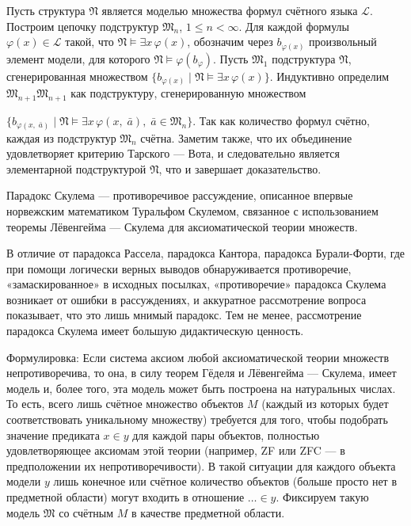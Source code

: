 \documentclass[12pt, specialist, subf, substylefile = spbu.rtx]{disser}
\begin{document}
Пусть структура ${\mathfrak  N}$ является моделью множества формул счётного языка $ {\mathcal  L}$. Построим цепочку подструктур ${\mathfrak  {M}}_{n}$, $1\leqslant n<\infty $. Для каждой формулы $\varphi (x)\in {\mathcal  {L}}$ такой, что ${\mathfrak  {N}}\models \exists x\,\varphi (x)$, обозначим через $b_{{\varphi (x)}}$ произвольный элемент модели, для которого ${\mathfrak  {N}}\models \varphi (b_{\varphi })$. Пусть ${\mathfrak  {M}}_{1}$ подструктура ${\mathfrak  {N}}$, сгенерированная множеством $\{b_{{\varphi (x)}}\mid {\mathfrak  {N}}\models \exists x\,\varphi (x)\}$.
Индуктивно определим ${\displaystyle {\mathfrak {M}}_{n+1}} {\mathfrak  {M}}_{{n+1}}$ как подструктуру, сгенерированную множеством

$\{b_{{\varphi (x,\;{\bar  {a}})}}\mid {\mathfrak  {N}}\models \exists x\,\varphi (x,\;{\bar  {a}}),\;{\bar  {a}}\in {\mathfrak  {M}}_{n}\}$.
Так как количество формул счётно, каждая из подструктур ${\mathfrak  {M}}_{n}$ счётна. Заметим также, что их объединение удовлетворяет критерию Тарского — Вота, и следовательно является элементарной подструктурой ${\mathfrak  {N}}$, что и завершает доказательство.

Парадокс Скулема — противоречивое рассуждение, описанное впервые норвежским математиком Туральфом Скулемом, связанное с использованием теоремы Лёвенгейма — Скулема для аксиоматической теории множеств.

В отличие от парадокса Рассела, парадокса Кантора, парадокса Бурали-Форти, где при помощи логически верных выводов обнаруживается противоречие, «замаскированное» в исходных посылках, «противоречие» парадокса Скулема возникает от ошибки в рассуждениях, и аккуратное рассмотрение вопроса показывает, что это лишь мнимый парадокс. Тем не менее, рассмотрение парадокса Скулема имеет большую дидактическую ценность.

Формулировка: Если система аксиом любой аксиоматической теории множеств непротиворечива, то она, в силу теорем Гёделя и Лёвенгейма — Скулема, имеет модель и, более того, эта модель может быть построена на натуральных числах. То есть, всего лишь счётное множество объектов $M$ (каждый из которых будет соответствовать уникальному множеству) требуется для того, чтобы подобрать значение предиката $x\in y$ для каждой пары объектов, полностью удовлетворяющее аксиомам этой теории (например, ZF или ZFC — в предположении их непротиворечивости). В такой ситуации для каждого объекта модели $y$ лишь конечное или счётное количество объектов (больше просто нет в предметной области) могут входить в отношение $\ldots \in y$. Фиксируем такую модель ${\mathfrak {M}}$ со счётным $M$ в качестве предметной области.
\end{document}
